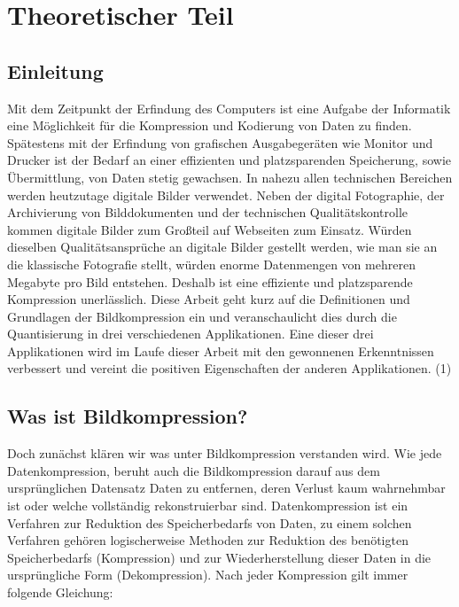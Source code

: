 
\section{Theoretischer Teil}

\subsection{\textbf{Einleitung}}
Mit dem Zeitpunkt der Erfindung des Computers ist eine Aufgabe der Informatik eine Möglichkeit für die Kompression und Kodierung von Daten zu finden. Spätestens mit der Erfindung von grafischen Ausgabegeräten wie Monitor und Drucker ist der Bedarf an einer effizienten und platzsparenden Speicherung, sowie Übermittlung, von Daten stetig gewachsen. In nahezu allen technischen Bereichen werden heutzutage digitale Bilder verwendet. Neben der digital Fotographie, der Archivierung von Bilddokumenten und der technischen Qualitätskontrolle kommen digitale Bilder zum Großteil auf Webseiten zum Einsatz. Würden dieselben Qualitätsansprüche an digitale Bilder gestellt werden, wie man sie an die klassische Fotografie stellt, würden enorme Datenmengen von mehreren Megabyte pro Bild entstehen. Deshalb ist eine effiziente und platzsparende Kompression unerlässlich. Diese Arbeit geht kurz auf die Definitionen und Grundlagen der Bildkompression ein und veranschaulicht dies durch die Quantisierung in drei verschiedenen Applikationen. Eine dieser drei Applikationen wird im Laufe dieser Arbeit mit den gewonnenen Erkenntnissen verbessert und vereint die positiven Eigenschaften der anderen Applikationen. (1)
\subsection{\textbf{Was ist Bildkompression?}}
Doch zunächst klären wir was unter Bildkompression verstanden wird. Wie jede Datenkompression, beruht auch die Bildkompression darauf aus dem ursprünglichen Datensatz Daten zu entfernen, deren Verlust kaum wahrnehmbar ist oder welche vollständig rekonstruierbar sind. Datenkompression ist ein Verfahren zur Reduktion des Speicherbedarfs von Daten, zu einem solchen Verfahren gehören logischerweise Methoden zur Reduktion des benötigten Speicherbedarfs (Kompression) und zur Wiederherstellung dieser Daten in die ursprüngliche Form (Dekompression). Nach jeder Kompression gilt immer folgende Gleichung:

